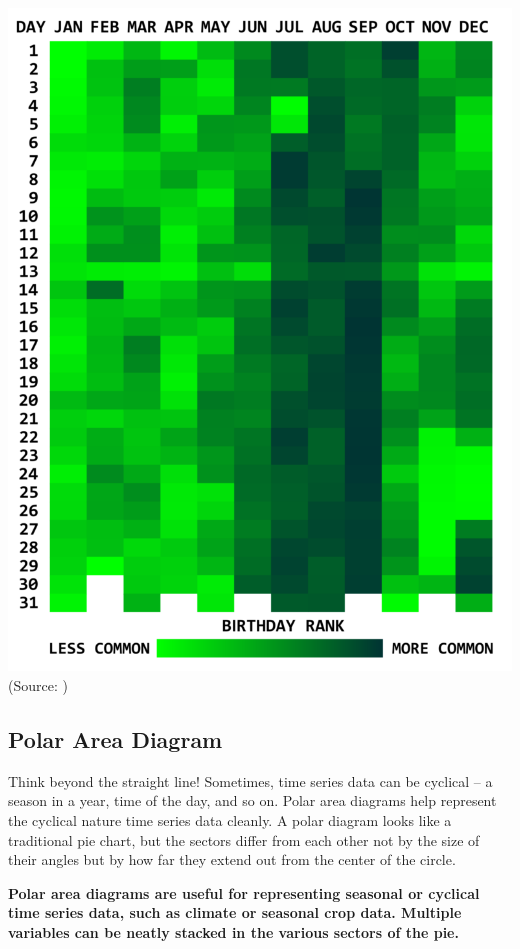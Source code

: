 \documentclass[]{book}
\theoremstyle{definition}
\theoremstyle{definition}
\theoremstyle{definition}
\theoremstyle{remark}
\begin{document}
\includegraphics{images/aya-heat-map.png} (Source:
\citep{aya-time-series})

\subsection{Polar Area Diagram}\label{polar-area-diagram}

Think beyond the straight line! Sometimes, time series data can be
cyclical -- a season in a year, time of the day, and so on. Polar area
diagrams help represent the cyclical nature time series data cleanly. A
polar diagram looks like a traditional pie chart, but the sectors differ
from each other not by the size of their angles but by how far they
extend out from the center of the circle.

\textbf{Polar area diagrams are useful for representing seasonal or
cyclical time series data, such as climate or seasonal crop data.
Multiple variables can be neatly stacked in the various sectors of the
pie.}
\end{document}
